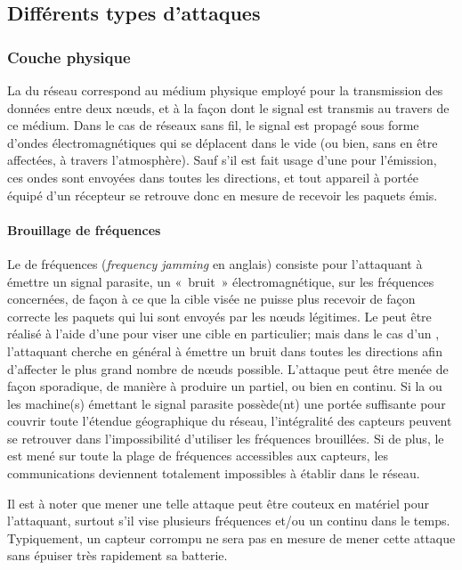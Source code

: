 \subsection{Différents types d'attaques}

    \subsubsection{Couche physique}
La  du réseau correspond au médium physique employé pour la transmission des données entre deux nœuds, et à la façon dont le signal est transmis au travers de ce médium.
Dans le cas de réseaux sans fil, le signal est propagé sous forme d'ondes électromagnétiques qui se déplacent dans le vide (ou bien, sans en être affectées, à travers l'atmosphère).
Sauf s'il est fait usage d'une  pour l'émission, ces ondes sont envoyées dans toutes les directions, et tout appareil à portée équipé d'un récepteur se retrouve donc en mesure de recevoir les paquets émis.

        \paragraph{Brouillage de fréquences}
Le  de fréquences (\textit{frequency jamming} en anglais) consiste pour l'attaquant à émettre un signal parasite, un « bruit » électromagnétique, sur les fréquences concernées, de façon à ce que la cible visée ne puisse plus recevoir de façon correcte les paquets qui lui sont envoyés par les nœuds légitimes.
Le  peut être réalisé à l'aide d'une  pour viser une cible en particulier; mais dans le cas d'un \rc, l'attaquant cherche en général à émettre un bruit dans toutes les directions afin d'affecter le plus grand nombre de nœuds possible.
L'attaque peut être menée de façon sporadique, de manière à produire un \dds partiel, ou bien en continu.
Si la ou les machine(s) émettant le signal parasite possède(nt) une portée suffisante pour couvrir toute l'étendue géographique du réseau, l'intégralité des capteurs peuvent se retrouver dans l'impossibilité d'utiliser les fréquences brouillées.
Si de plus, le  est mené sur toute la plage de fréquences accessibles aux capteurs, les communications deviennent totalement impossibles à établir dans le réseau.

Il est à noter que mener une telle attaque peut être couteux en matériel pour l'attaquant, surtout s'il vise plusieurs fréquences et/ou un  continu dans le temps.
Typiquement, un capteur corrompu ne sera pas en mesure de mener cette attaque sans épuiser très rapidement sa batterie.

